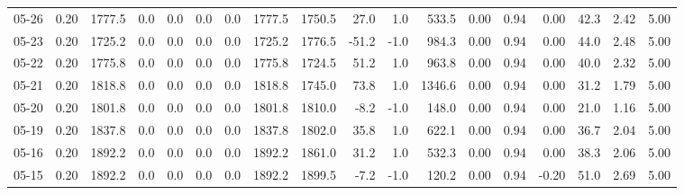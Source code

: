 \begin{threeparttable}
{\begin{tabular}{lrrrrrrrrrrrrrrrrr}
  05-26 &     0.20 & 1777.5 &               0.0 &               0.0 &                0.0 &                0.0 & 1777.5 & 1750.5 &       27.0 &                      1.0 &               533.5 &       0.00 &      0.94 &           0.00 &             42.3 &            2.42 &                   5.00 \\
  05-23 &     0.20 & 1725.2 &               0.0 &               0.0 &                0.0 &                0.0 & 1725.2 & 1776.5 &      -51.2 &                     -1.0 &               984.3 &       0.00 &      0.94 &           0.00 &             44.0 &            2.48 &                   5.00 \\
  05-22 &     0.20 & 1775.8 &               0.0 &               0.0 &                0.0 &                0.0 & 1775.8 & 1724.5 &       51.2 &                      1.0 &               963.8 &       0.00 &      0.94 &           0.00 &             40.0 &            2.32 &                   5.00 \\
  05-21 &     0.20 & 1818.8 &               0.0 &               0.0 &                0.0 &                0.0 & 1818.8 & 1745.0 &       73.8 &                      1.0 &              1346.6 &       0.00 &      0.94 &           0.00 &             31.2 &            1.79 &                   5.00 \\
  05-20 &     0.20 & 1801.8 &               0.0 &               0.0 &                0.0 &                0.0 & 1801.8 & 1810.0 &       -8.2 &                     -1.0 &               148.0 &       0.00 &      0.94 &           0.00 &             21.0 &            1.16 &                   5.00 \\
  05-19 &     0.20 & 1837.8 &               0.0 &               0.0 &                0.0 &                0.0 & 1837.8 & 1802.0 &       35.8 &                      1.0 &               622.1 &       0.00 &      0.94 &           0.00 &             36.7 &            2.04 &                   5.00 \\
  05-16 &     0.20 & 1892.2 &               0.0 &               0.0 &                0.0 &                0.0 & 1892.2 & 1861.0 &       31.2 &                      1.0 &               532.3 &       0.00 &      0.94 &           0.00 &             38.3 &            2.06 &                   5.00 \\
  05-15 &     0.20 & 1892.2 &               0.0 &               0.0 &                0.0 &                0.0 & 1892.2 & 1899.5 &       -7.2 &                     -1.0 &               120.2 &       0.00 &      0.94 &          -0.20 &             51.0 &            2.69 &                   5.00 \\

\end{tabular}}
\end{threeparttable}
